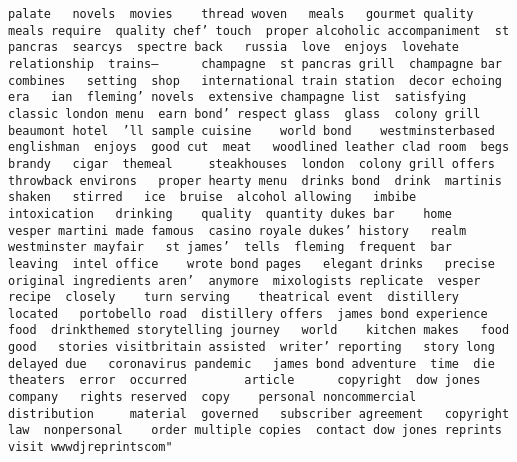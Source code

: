\documentclass[
]{article}
\begin{document}
\begin{verbatim}
palate   novels  movies    thread woven   meals   gourmet quality  meals require  quality chef’ touch  proper alcoholic accompaniment  st pancras  searcys  spectre back   russia  love  enjoys  lovehate relationship  trains—      champagne  st pancras grill  champagne bar combines   setting  shop   international train station  decor echoing  era   ian  fleming’ novels  extensive champagne list  satisfying classic london menu  earn bond’ respect glass  glass  colony grill   beaumont hotel  ’ll sample cuisine    world bond    westminsterbased englishman  enjoys  good cut  meat   woodlined leather clad room  begs  brandy   cigar  themeal     steakhouses  london  colony grill offers throwback environs   proper hearty menu  drinks bond  drink  martinis shaken   stirred   ice  bruise  alcohol allowing   imbibe   intoxication   drinking    quality  quantity dukes bar    home   vesper martini made famous  casino royale dukes’ history   realm  westminster mayfair   st james’  tells  fleming  frequent  bar  leaving  intel office    wrote bond pages   elegant drinks   precise original ingredients aren’  anymore  mixologists replicate  vesper recipe  closely    turn serving    theatrical event  distillery located   portobello road  distillery offers  james bond experience    food  drinkthemed storytelling journey   world    kitchen makes   food   good   stories visitbritain assisted  writer’ reporting   story long delayed due   coronavirus pandemic   james bond adventure  time  die     theaters  error  occurred        article      copyright  dow jones  company   rights reserved  copy    personal noncommercial   distribution     material  governed   subscriber agreement   copyright law  nonpersonal    order multiple copies  contact dow jones reprints    visit wwwdjreprintscom"                                                                                                                                                                                                                                                                                                                                                                                                                                                                                                                                                                                                                                                                                                                                                                                                                                                                                                                                                                                                                                                                                                                                                                                                                                                                                                                                                                                                                                                                                                                                                                                      
\end{verbatim}
\end{document}
